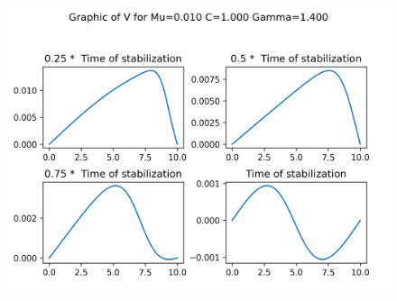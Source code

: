\begin{figure}[H]
	\includegraphics[scale=0.5]{../graphs_data_nonsmooth_2/slices/Graph_V_mu0.010_C1.000_gamma1.400.png}
\end{figure}

